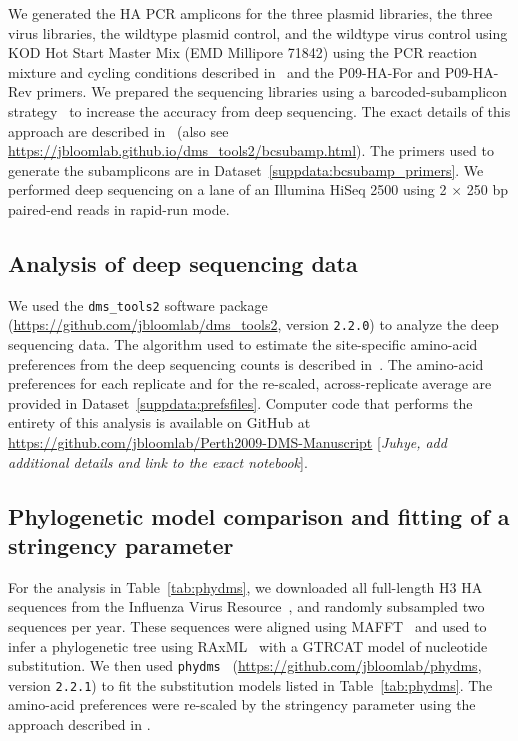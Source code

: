\documentclass[9pt,twocolumn,twoside]{pnas-new}
\newcommand{\comment}[1]{{\color{red}[\textsl{#1}]}}
\begin{document}
{We generated the HA PCR amplicons for the three plasmid libraries, the three virus libraries, the wildtype plasmid control, and the wildtype virus control using KOD Hot Start Master Mix (EMD Millipore 71842) using the PCR reaction mixture and cycling conditions described in~\cite{bloom2014experimentally} and the P09-HA-For and P09-HA-Rev primers.
We prepared the sequencing libraries using a barcoded-subamplicon strategy~\cite{wu2014high} to increase the accuracy from deep sequencing.
The exact details of this approach are described in~\cite{doud2016accurate} (also see \url{https://jbloomlab.github.io/dms_tools2/bcsubamp.html}).
The primers used to generate the subamplicons are in Dataset~\ref{suppdata:bcsubamp_primers}.
We performed deep sequencing on a lane of an Illumina HiSeq 2500 using 2 $\times$ 250 bp paired-end reads in rapid-run mode.

\subsection*{Analysis of deep sequencing data}
We used the \texttt{dms\_tools2} software package~\cite{bloom2015software} (\url{https://github.com/jbloomlab/dms_tools2}, version \texttt{2.2.0}) to analyze the deep sequencing data.
The algorithm used to estimate the site-specific amino-acid preferences from the deep sequencing counts is described in~\cite{bloom2015software}.
The amino-acid preferences for each replicate and for the re-scaled, across-replicate average are provided in Dataset~\ref{suppdata:prefsfiles}.
Computer code that performs the entirety of this analysis is available on GitHub at \url{https://github.com/jbloomlab/Perth2009-DMS-Manuscript} \comment{Juhye, add additional details and link to the exact notebook}.

\subsection*{Phylogenetic model comparison and fitting of a stringency parameter}
For the analysis in Table~\ref{tab:phydms}, we downloaded all full-length H3 HA sequences from the Influenza Virus Resource~\cite{bao2008}, and randomly subsampled two sequences per year.
These sequences were aligned using MAFFT~\cite{katoh2013mafft} and used to infer a phylogenetic tree using RAxML~\cite{stamatakis2006raxml} with a GTRCAT model of nucleotide substitution.
We then used \texttt{phydms}~\cite{hilton2017phydms} (\url{https://github.com/jbloomlab/phydms}, version \texttt{2.2.1}) to fit the substitution models listed in Table~\ref{tab:phydms}.
The amino-acid preferences were re-scaled by the stringency parameter using the approach described in \cite{hilton2017phydms}.

}
\end{document}
